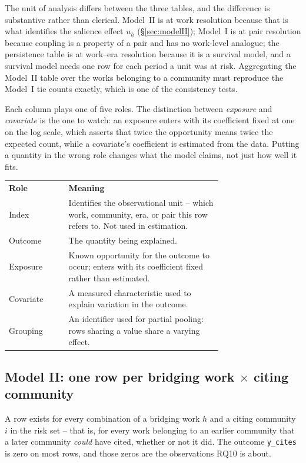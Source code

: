 \documentclass[11pt]{article}
\newcommand{\doublerule}{%
  \specialrule{\lightrulewidth}{0pt}{\doublerulesep}%
  \specialrule{\lightrulewidth}{0pt}{0pt}}
\newcommand{\code}[1]{\texttt{\small #1}}
\begin{document}
The unit of analysis differs between the three tables, and the difference is substantive
rather than clerical. Model~II is at work resolution because that is what identifies the
salience effect $u_h$ (\S\ref{sec:modelII}); Model~I is at pair resolution because coupling is
a property of a pair and has no work-level analogue; the persistence table is at
work--era resolution because it is a survival model, and a survival model needs one row for
each period a unit was at risk. Aggregating the Model~II table over the works belonging to a
community must reproduce the Model~I tie counts exactly, which is one of the consistency
tests.

Each column plays one of five roles. The distinction between \emph{exposure} and
\emph{covariate} is the one to watch: an exposure enters with its coefficient fixed at one on
the log scale, which asserts that twice the opportunity means twice the expected count, while
a covariate's coefficient is estimated from the data. Putting a quantity in the wrong role
changes what the model claims, not just how well it fits.

\begin{center}
\small
\begin{tabular}{@{}lp{0.72\linewidth}@{}}
\toprule
\textbf{Role} & \textbf{Meaning}\\
\doublerule
Index    & Identifies the observational unit -- which work, community, era, or pair this row
           refers to. Not used in estimation.\\
Outcome  & The quantity being explained.\\
Exposure & Known opportunity for the outcome to occur; enters with its coefficient fixed
           rather than estimated.\\
Covariate& A measured characteristic used to explain variation in the outcome.\\
Grouping & An identifier used for partial pooling: rows sharing a value share a varying
           effect.\\
\bottomrule
\end{tabular}
\end{center}

\subsection{Model II: one row per bridging work $\times$ citing community}

A row exists for every combination of a bridging work $h$ and a citing community $i$ in the
risk set -- that is, for every work belonging to an earlier community that a later community
\emph{could} have cited, whether or not it did. The outcome \code{y\_cites} is zero on most
rows, and those zeros are the observations RQ10 is about.
\end{document}
